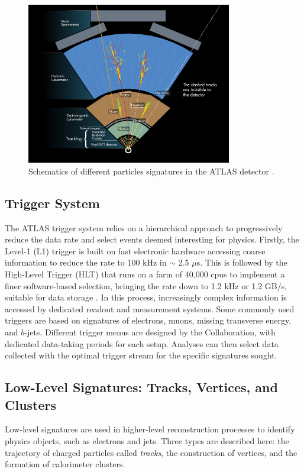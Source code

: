 \begin{figure}[!h]
  \centering
  \includegraphics[width=0.8\textwidth]{Images/ATLAS/ATLASdetection.jpg}
  \caption{Schematics of different particles signatures in the ATLAS detector \cite{Pequenao:1505342}.}
  \label{fig-ATLASdetect}
\end{figure}

\subsection{Trigger System}\label{sub-sec-trigger}
The ATLAS trigger system relies on a hierarchical approach to progressively reduce the data rate and select events deemed interesting for physics. Firstly, the Level-1 (L1) trigger is built on fast electronic hardware accessing coarse information to reduce the rate to 100 kHz in $\sim$ 2.5 $\mu$s. This is followed by the High-Level Trigger (HLT) that runs on a farm of 40,000 \glspl{cpu} to implement a finer software-based selection, bringing the rate down to 1.2 kHz or 1.2 GB/s, suitable for data storage \cite{TriggerATLAScollaboration_2020}. In this process, increasingly complex information is accessed by dedicated readout and measurement systems. Some commonly used triggers are based on signatures of electrons, muons, missing transverse energy, and $b$-jets. Different trigger menus are designed by the Collaboration, with dedicated data-taking periods for each setup. Analyses can then select data collected with the optimal trigger stream for the specific signatures sought.

\subsection{Low-Level Signatures: Tracks, Vertices, and Clusters}\label{sec-atlas-lw}
Low-level signatures are used in higher-level reconstruction processes to identify physics objects, such as electrons and jets. Three types are described here: the trajectory of charged particles called \textit{tracks}, the construction of vertices, and the formation of calorimeter clusters. \\

